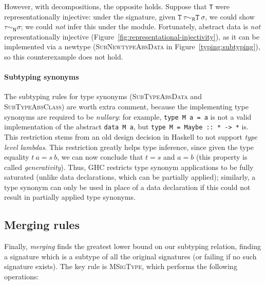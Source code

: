 However, with decompositions, the opposite holds. Suppose that \verb|T|
were representationally injective: under the signature, given
$\texttt{T}~\tau \sim_\textsf{R} \texttt{T}~\sigma$, we could
show $\tau \sim_\textsf{N} \sigma$; we could \emph{not} infer
this under the module.
Fortunately, abstract data is \emph{not}
representationally injective (Figure~\ref{fig:representational-injectivity}), as it can be implemented via
a newtype (\textsc{SubNewtypeAbsData} in Figure~\ref{typing:subtyping}),
so this counterexample does not hold.

\paragraph{Subtyping synonyms}
The subtyping rules for type synonyms (\textsc{SubTypeAbsData} and
\textsc{SubTypeAbsClass}) are worth extra comment, because the implementing
type synonyms are required to be \emph{nullary}: for example, \verb|type M a = a|
is not a valid implementation of the abstract \verb|data M a|,
but \verb|type M = Maybe :: * -> *| is.  This restriction
stems from an old design decision in Haskell to not support \emph{type level
lambdas}.  This restriction greatly helps type inference, since given the
type equality $t~a = s~b$, we can now conclude that $t = s$ and $a = b$
(this property is called \emph{generativity}).  Thus, GHC restricts type
synonym applications to be fully saturated (unlike data declarations, which can
be partially applied); similarly, a type synonym can only be used in place
of a data declaration if this could not result in partially applied type
synonyms.

\subsection{Merging rules}



Finally, \emph{merging} finds the greatest lower bound on our subtyping relation,
finding a signature which is a subtype of all the original signatures (or failing
if no such signature exists).  The key rule is \textsc{MSigType}, which performs
the following operations:

